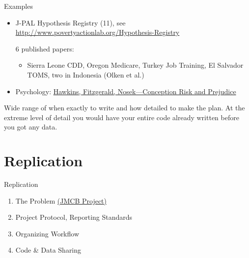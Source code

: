 \documentclass{beamer}
\begin{document}
\begin{frame}{Examples}

\begin{itemize}[<.->]
\item
J-PAL Hypothesis Registry (11), see \url{http://www.povertyactionlab.org/Hypothesis-Registry}

6 published papers:
\begin{itemize}
\item
 Sierra Leone CDD, Oregon Medicare, Turkey Job Training, El Salvador TOMS, two in Indonesia (Olken et al.)
\end{itemize}
\item Psychology: \href{http://pss.sagepub.com/content/26/2/249}{Hawkins, Fitzgerald, Nosek---Conception Risk and Prejudice}
\end{itemize} 
\vspace{0.25in}
Wide range of when exactly to write and how detailed to make the plan. At the extreme level of detail you would have your entire code already written before you got any data.
\end{frame}

\section{Replication}
\begin{frame}{Replication}
\begin{enumerate}[<.->]
 \item The Problem	\href{http://www.jstor.org/stable/1806061}{(JMCB Project)}
 \item Project Protocol, Reporting Standards
 \item Organizing Workflow
 \item Code \& Data Sharing
\end{enumerate}
\end{frame}

 { %
    \begin{frame}[plain, label=AEAreg]
     \end{frame}
}
\end{document}
